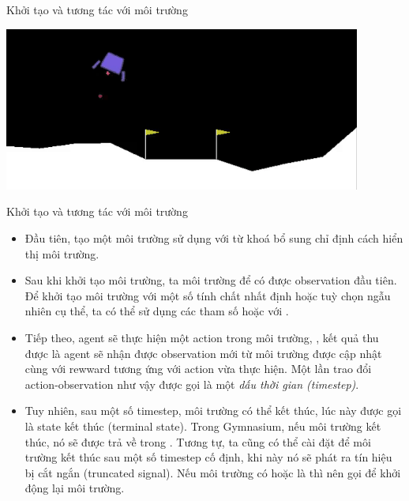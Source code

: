 \documentclass[10pt,aspectratio=169]{beamer}
\begin{document}
\begin{frame}[fragile]{Khởi tạo và tương tác với môi trường}{\subsecname}
\begin{center}
\includegraphics[width=0.88\textwidth, frame]{source/13.png}
\end{center}
\end{frame}

\begin{frame}[fragile]{Khởi tạo và tương tác với môi trường}{\subsecname}
\footnotesize
\begin{itemize}
\setlength\itemsep{8pt}
\item Đầu tiên, tạo một môi trường sử dụng  với từ khoá bổ sung  chỉ định cách hiển thị môi trường. 
\item Sau khi khởi tạo môi trường, ta  môi trường để có được observation đầu tiên. Để khởi tạo môi trường với một số tính chất nhất định hoặc tuỳ chọn ngẫu nhiên cụ thể, ta có thể sử dụng các tham số  hoặc  với .
\item Tiếp theo, agent sẽ thực hiện một action trong môi trường, , kết quả thu được là agent sẽ nhận được observation mới từ môi trường được cập nhật cùng với rewward tương ứng với action vừa thực hiện. Một lần trao đổi action-observation như vậy được gọi là một \textit{dấu thời gian (timestep)}.
\item Tuy nhiên, sau một số timestep, môi trường có thể kết thúc, lúc này được gọi là state kết thúc (terminal state). Trong Gymnasium, nếu môi trường kết thúc, nó sẽ được trả về trong . Tương tự, ta cũng có thể cài đặt để môi trường kết thúc sau một số timestep cố định, khi này nó sẽ phát ra tín hiệu bị cắt ngắn (truncated signal). Nếu môi trường có  hoặc  là  thì nên gọi  để khởi động lại môi trường.
\end{itemize}
\end{frame}
\end{document}
